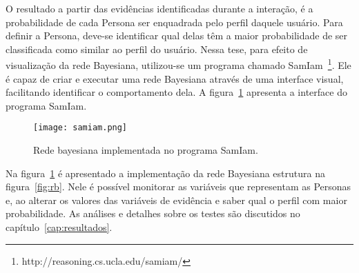 O resultado a partir das evidências identificadas durante a interação, é a probabilidade de cada Persona ser enquadrada pelo perfil daquele usuário. Para definir a Persona, deve-se identificar qual delas têm a maior probabilidade de ser classificada como similar ao perfil do usuário. Nessa tese, para efeito de visualização da rede Bayesiana, utilizou-se um programa chamado SamIam~\footnote{http://reasoning.cs.ucla.edu/samiam/}. Ele é capaz de criar e executar uma rede Bayesiana através de uma interface visual, facilitando identificar o comportamento dela. A figura~\ref{fig:samiam} apresenta a interface do programa SamIam.

\begin{figure}[ht!]
	\centering
	\begin{minipage}{\textwidth}
		\caption{Rede bayesiana implementada no programa SamIam.}
		\texttt{[image: samiam.png]}
		\label{fig:samiam}
	\end{minipage}
\end{figure}

Na figura~\ref{fig:samiam} é apresentado a implementação da rede Bayesiana estrutura na figura~\ref{fig:rb}. Nele é possível monitorar as variáveis que representam as Personas e, ao alterar os valores das variáveis de evidência e saber qual o perfil com maior probabilidade. As análises e detalhes sobre os testes são discutidos no capítulo~\ref{cap:resultados}.